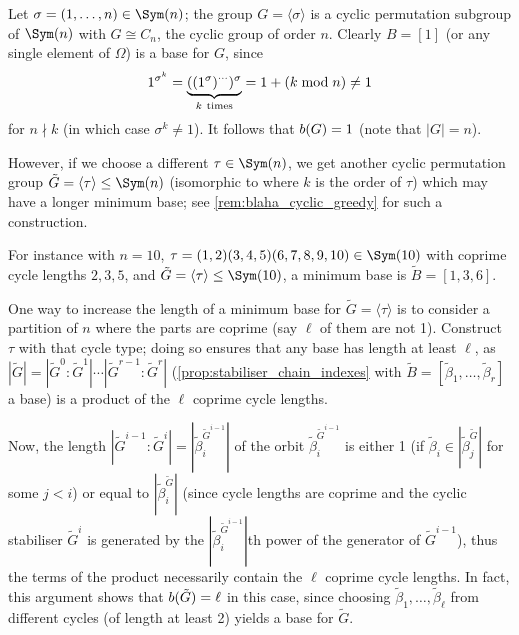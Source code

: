 \begin{example}\label{eg:cyclic_group_base}
    Let $\sigma = (1,\dotsc,n) \in \Sym(n)$; the group $G = \langle \sigma \rangle$ is a cyclic permutation subgroup of $\Sym(n)$ with $G \cong C_n$, the cyclic group of order $n$. Clearly  $B = [1]$ (or any single element of $\Omega$) is a base for $G$, since
    $$1^{\sigma^k} = \underbrace{((1^\sigma)^{\cdots})^\sigma}_{k\ \text{times}} = \added{2}{1 + (k \mathrel{\operatorname{mod}} n)} \neq 1$$
    for $n \nmid k$ (in which case $\sigma^k \neq 1$). It follows that $\added{2}{b(G)} = 1$ (note that $|G| = n$).

    However, if we choose a different $\tau \in \Sym(n)$, we get another cyclic permutation group $\tilde G = \langle \tau \rangle \leq \Sym(n)$ (isomorphic to  where $k$ is the order of $\tau$) which may have a longer minimum base; see \autoref{rem:blaha_cyclic_greedy} for such a construction.

    For instance with $n = 10$, $\tau = (1,2)(3,4,5)(6,7,8,9,10) \in \Sym(10)$ with coprime cycle lengths $2,3,5$, and $\tilde G = \langle \tau \rangle \leq \Sym(10)$, a minimum base is $\tilde B = [1,3,6]$. 

    One way to increase the length of a minimum base for $\tilde G = \langle \tau \rangle$ is to consider a partition of $n$ where the parts are coprime (say $\ell$ of them are not 1). Construct $\tau$ with that cycle type; doing so ensures that any base has length at least $\ell$, as $|\tilde G| = |\tilde G^0 : \tilde G^1| \dotsb |\tilde G^{r-1} : \tilde G^r|$ (\autoref{prop:stabiliser_chain_indexes} with $\tilde B = [\tilde\beta_1,\dotsc,\tilde\beta_r]$ a base) is a product of the $\ell$ coprime cycle lengths.

    Now, the length $|\tilde G^{i-1} : \tilde G^i| = |\tilde\beta_i^{\tilde G^{i-1}}|$ of the orbit $\tilde\beta_i^{\tilde G^{i-1}}$ is either 1 (if $\tilde\beta_i \in |\tilde\beta_j^{\tilde G}|$ for some $j < i$) or equal to $|\tilde\beta_i^{\tilde G}|$ (since cycle lengths are coprime and the cyclic stabiliser $\tilde G^i$ is generated by the $|\tilde\beta_i^{\tilde G^{i-1}}|$th power of the generator of $\tilde G^{i-1}$), thus the terms of the product necessarily contain the $\ell$ coprime cycle lengths. In fact, this argument shows that $\added{2}{b}(\tilde G) = \ell$ in this case, since choosing $\tilde\beta_1,\dotsc,\tilde\beta_\ell$ from different cycles (of length at least 2) yields a base for $\tilde G$.
\end{example}

